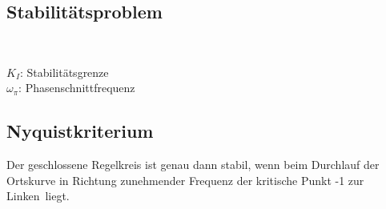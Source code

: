 


	\subsection{Stabilitätsproblem }
		\begin{minipage}{5cm}
		 \\
		\end{minipage}
		\begin{minipage}{13cm}
        $K_I$: Stabilitätsgrenze \\
        $\omega_\pi$: Phasenschnittfrequenz
        \end{minipage}


	\subsection{Nyquistkriterium }
		Der geschlossene Regelkreis ist genau dann stabil, wenn beim Durchlauf der
		Ortskurve in Richtung zunehmender Frequenz der kritische Punkt -1 \glqq zur
		Linken\grqq\ liegt.
		
